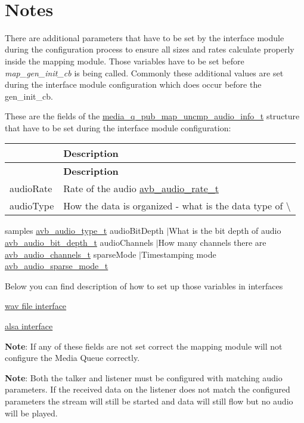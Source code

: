 ~\newline
 \section*{Notes}

There are additional parameters that have to be set by the interface module during the configuration process to ensure all sizes and rates calculate properly inside the mapping module. Those variables have to be set before {\itshape map\+\_\+gen\+\_\+init\+\_\+cb} is being called. Commonly these additional values are set during the interface module configuration which does occur before the gen\+\_\+init\+\_\+cb.

These are the fields of the \hyperlink{structmedia__q__pub__map__uncmp__audio__info__t}{media\+\_\+q\+\_\+pub\+\_\+map\+\_\+uncmp\+\_\+audio\+\_\+info\+\_\+t} structure that have to be set during the interface module configuration\+:

\tabulinesep=1mm
\begin{longtabu} spread 0pt [c]{*2{|X[-1]}|}
\hline
{}&{\bf Description  }\\
\endfirsthead
\hline
\endfoot
\hline
{}&{\bf Description  }\\
\endhead
audio\+Rate &Rate of the audio \hyperlink{openavb__audio__pub_8h_a6070f1cfbb6824de6f0b2524cd306903}{avb\+\_\+audio\+\_\+rate\+\_\+t} \\
audio\+Type &How the data is organized -\/ what is the data type of \textbackslash{} \\
\end{longtabu}
samples \hyperlink{openavb__audio__pub_8h_a680efa0db2b29a63c5a0e8f11975682f}{avb\+\_\+audio\+\_\+type\+\_\+t} audio\+Bit\+Depth $\vert$\+What is the bit depth of audio \hyperlink{openavb__audio__pub_8h_ae64ee32f6ac9a6b2cf607f46ee4160bd}{avb\+\_\+audio\+\_\+bit\+\_\+depth\+\_\+t} audio\+Channels $\vert$\+How many channels there are \hyperlink{openavb__audio__pub_8h_a8cc6b9a1352da050ead620139f49acc4}{avb\+\_\+audio\+\_\+channels\+\_\+t} sparse\+Mode $\vert$\+Timestamping mode \hyperlink{openavb__map__aaf__audio_8c_af4359f8edef6a32baf92eb80ec13176a}{avb\+\_\+audio\+\_\+sparse\+\_\+mode\+\_\+t}

Below you can find description of how to set up those variables in interfaces
\begin{DoxyItemize}
\item \hyperlink{wav_file_intf}{wav file interface}
\item \hyperlink{alsa_intf}{alsa interface}
\end{DoxyItemize}

{\bfseries Note}\+: If any of these fields are not set correct the mapping module will not configure the Media Queue correctly.

{\bfseries Note}\+: Both the talker and listener must be configured with matching audio parameters. If the received data on the listener does not match the configured parameters the stream will still be started and data will still flow but no audio will be played. 